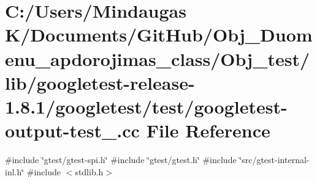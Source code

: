 \hypertarget{_obj__test_2lib_2googletest-release-1_88_81_2googletest_2test_2googletest-output-test___8cc}{}\section{C\+:/\+Users/\+Mindaugas K/\+Documents/\+Git\+Hub/\+Obj\+\_\+\+Duomenu\+\_\+apdorojimas\+\_\+class/\+Obj\+\_\+test/lib/googletest-\/release-\/1.8.1/googletest/test/googletest-\/output-\/test\+\_\+.cc File Reference}
\label{_obj__test_2lib_2googletest-release-1_88_81_2googletest_2test_2googletest-output-test___8cc}
{\ttfamily \#include \char`\"{}gtest/gtest-\/spi.\+h\char`\"{}}\newline
{\ttfamily \#include \char`\"{}gtest/gtest.\+h\char`\"{}}\newline
{\ttfamily \#include \char`\"{}src/gtest-\/internal-\/inl.\+h\char`\"{}}\newline
{\ttfamily \#include $<$stdlib.\+h$>$}\newline
